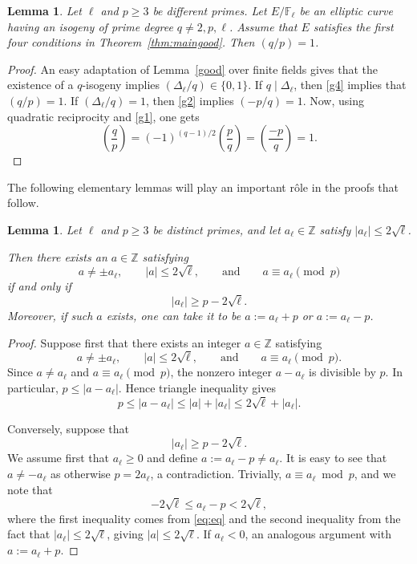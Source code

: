 \documentclass[12pt]{amsart}
\numberwithin{equation}{section}
\newtheorem{lemma}[equation]{Lemma}
\theoremstyle{definition}
\newcommand{\F}{\mathbb{F}}
\newcommand{\Z}{\mathbb{Z}}
\begin{document}
\begin{lemma}\label{lem:square}
    Let $\ell$ and $p \geq 3$ be different primes.
    Let $E/\F_\ell$ be an elliptic curve having an isogeny of prime degree $q\neq 2,p, \ell$. Assume that $E$ satisfies the first four conditions in Theorem~\ref{thm:maingood}. Then $(q/p)=1$.
\end{lemma}
\begin{proof} 
    An easy adaptation of Lemma~\ref{good} over finite fields gives that the existence of a $q$-isogeny implies $(\Delta_\ell/q)\in \{0,1\}$.
    If $q\mid \Delta_\ell$, then \eqref{g4} implies that
    $(q/p)=1$. If $(\Delta_\ell/q)=1$, then \eqref{g2} implies $(-p/q)=1$. Now, using quadratic reciprocity and \eqref{g1}, one gets
    \[
    \left( \frac{q}{p}\right)=(-1)^{(q-1)/2}\left( \frac{p}{q}\right)=\left( \frac{-p}{q}\right)=1.
    \]\end{proof}

The following elementary lemmas will play an important r\^ole in the proofs that follow. 
\begin{lemma} \label{lem:ala}
Let $\ell$ and $p\geq 3$ be distinct primes, and let
$a_\ell\in\mathbb{Z}$ satisfy
$|a_\ell|\leq 2\sqrt{\ell}$.

Then there exists an $a\in \Z$ satisfying
\[
a\neq \pm a_\ell,\qquad
|a|\leq 2\sqrt{\ell},
\qquad\text{and}\qquad
a\equiv a_\ell\pmod p
\]
if and only if
\[
|a_\ell|\geq p-2\sqrt{\ell}.
\]
Moreover, if such $a$ exists, one can take it to be $a:=a_\ell+p$ or $a:=a_\ell-p$. 
\end{lemma}

\begin{proof}
Suppose first that there exists an integer $a\in\mathbb{Z}$
satisfying
\[
a\neq \pm a_\ell,\qquad
|a|\leq 2\sqrt{\ell},
\qquad\text{and}\qquad
a\equiv a_\ell\pmod p.
\]
Since $a\neq a_\ell$ and $a\equiv a_\ell\pmod p$, the nonzero integer
$a-a_\ell$ is divisible by $p$. In particular,
$
p\leq |a-a_\ell|.
$
Hence triangle inequality gives
\[
p \leq |a-a_\ell|
\leq |a|+|a_\ell|
\leq 2\sqrt{\ell}+|a_\ell|.
\]

Conversely, suppose that \begin{equation}\label{eq:eq}
    |a_\ell|\geq p-2\sqrt{\ell}.
\end{equation}
We assume first that $a_\ell\geq 0$ and define
$
a:=a_\ell-p \neq a_\ell.$ It is easy to see that $a \neq -a_\ell$ as otherwise $p=2a_\ell$, a contradiction. Trivially, $a \equiv a_\ell \bmod p$, and we note that
\[
-2\sqrt \ell\leq a_\ell-p< 2\sqrt{\ell},
\]
where the first inequality comes from \eqref{eq:eq} and the second inequality from the fact that $|a_\ell|\leq 2\sqrt{\ell}$, giving $|a|\leq 2\sqrt{\ell}$. If $a_\ell<0$, an analogous argument with $a:=a_\ell+p$. 
\end{proof}
\end{document}
